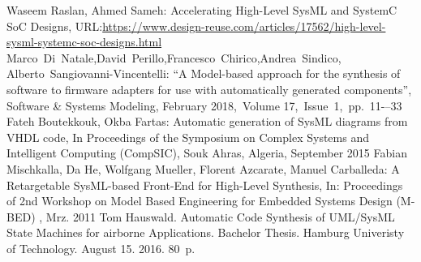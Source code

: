 \documentclass{llncs}
\begin{document}
\begin{thebibliography}{99}
 Waseem Raslan, Ahmed Sameh: Accelerating High-Level SysML and SystemC SoC Designs, URL:\url{https://www.design-reuse.com/articles/17562/high-level-sysml-systemc-soc-designs.html}
 Marco~Di~Natale,David~Perillo,Francesco~Chirico,Andrea~Sindico, Alberto~Sangiovanni-Vincentelli: “A Model-based approach for the synthesis of software to firmware adapters for use with automatically generated components”, Software \& Systems Modeling, February 2018,~Volume 17,~Issue~1,~pp.~11-–33
 Fateh Boutekkouk, Okba Fartas: Automatic generation of SysML diagrams from VHDL code, In Proceedings of the Symposium on Complex Systems and Intelligent Computing (CompSIC), Souk Ahras, Algeria, September 2015
 Fabian Mischkalla, Da He, Wolfgang Mueller, Florent Azcarate, Manuel Carballeda: A Retargetable SysML-based Front-End for High-Level Synthesis, In: Proceedings of 2nd Workshop on Model Based Engineering for Embedded Systems Design (M-BED) , Mrz. 2011
Tom Hauswald. Automatic Code Synthesis of UML/SysML State Machines for airborne Applications.  Bachelor Thesis. Hamburg Univeristy of Technology. August 15. 2016. 80~p.
\end{thebibliography}
\end{document}
